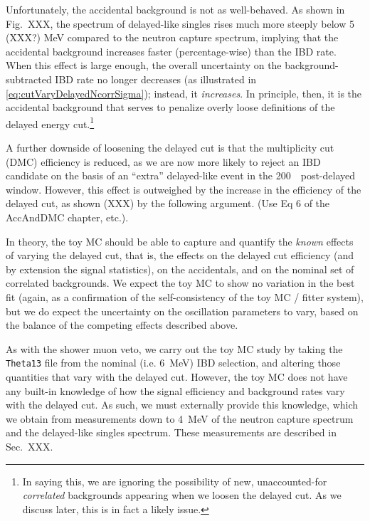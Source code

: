 \documentclass[../thesis.tex]{subfiles}
\begin{document}
Unfortunately, the accidental background is not as well-behaved. As shown in Fig.~XXX, the spectrum of delayed-like singles rises much more steeply below 5 (XXX?) MeV compared to the neutron capture spectrum, implying that the accidental background increases faster (percentage-wise) than the IBD rate. When this effect is large enough, the overall uncertainty on the background-subtracted IBD rate no longer decreases (as illustrated in \autoref{eq:cutVaryDelayedNcorrSigma}); instead, it \emph{increases}. In principle, then, it is the accidental background that serves to penalize overly loose definitions of the delayed energy cut.\footnote{In saying this, we are ignoring the possibility of new, unaccounted-for \emph{correlated} backgrounds appearing when we loosen the delayed cut. As we discuss later, this is in fact a likely issue.}

A further downside of loosening the delayed cut is that the multiplicity cut (DMC) efficiency is reduced, as we are now more likely to reject an IBD candidate on the basis of an ``extra'' delayed-like event in the 200~\us\ post-delayed window. However, this effect is outweighed by the increase in the efficiency of the delayed cut, as shown (XXX) by the following argument. (Use Eq 6 of the AccAndDMC chapter, etc.).

In theory, the toy MC should be able to capture and quantify the \emph{known} effects of varying the delayed cut, that is, the effects on the delayed cut efficiency (and by extension the signal statistics), on the accidentals, and on the nominal set of correlated backgrounds. We expect the toy MC to show no variation in the best fit (again, as a confirmation of the self-consistency of the toy MC / fitter system), but we do expect the uncertainty on the oscillation parameters to vary, based on the balance of the competing effects described above.

As with the shower muon veto, we carry out the toy MC study by taking the \texttt{Theta13} file from the nominal (i.e. 6~MeV) IBD selection, and altering those quantities that vary with the delayed cut. However, the toy MC does not have any built-in knowledge of how the signal efficiency and background rates vary with the delayed cut. As such, we must externally provide this knowledge, which we obtain from measurements down to 4~MeV of the neutron capture spectrum and the delayed-like singles spectrum. These measurements are described in Sec.~XXX.
\end{document}
